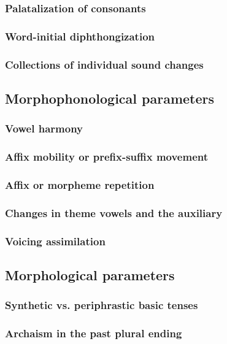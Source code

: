\subsubsection{Palatalization of consonants}

\subsubsection{Word-initial diphthongization}

\subsubsection{Collections of individual sound changes}

\subsection{Morphophonological parameters}

\subsubsection{Vowel harmony}

\subsubsection{Affix mobility or prefix-suffix movement}

\subsubsection{Affix or morpheme repetition}

\subsubsection{Changes in theme vowels and the auxiliary}

\subsubsection{Voicing assimilation}


\subsection{Morphological parameters}

\subsubsection{Synthetic vs. periphrastic basic tenses}

\subsubsection{Archaism in the past plural ending}
